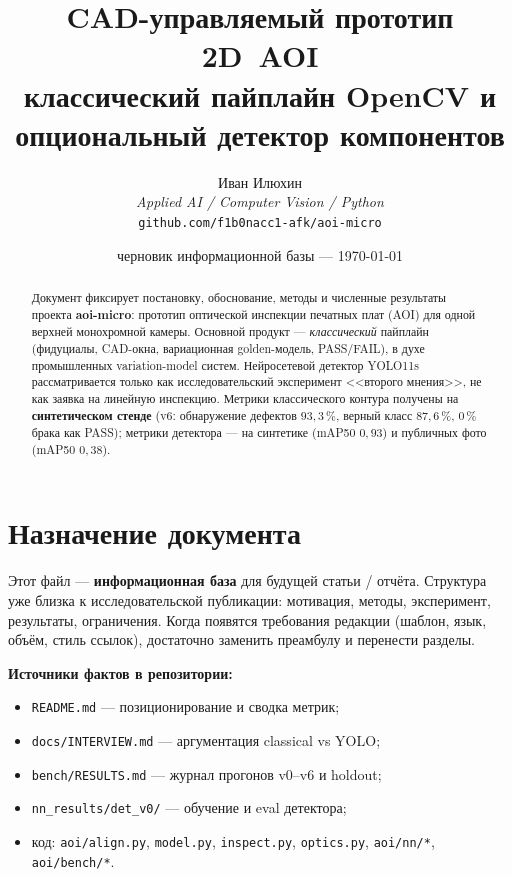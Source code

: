 \documentclass[12pt,a4paper]{article}
\title{CAD-управляемый прототип 2D~AOI\\
\large классический пайплайн OpenCV и опциональный детектор компонентов}
\author{Иван Илюхин\\
\textit{Applied AI / Computer Vision / Python}\\
\texttt{github.com/f1b0nacc1-afk/aoi-micro}}
\date{черновик информационной базы --- \today}
\begin{document}
\maketitle

\begin{abstract}
\noindent
Документ фиксирует постановку, обоснование, методы и численные результаты
проекта \textbf{aoi-micro}: прототип оптической инспекции печатных плат (AOI)
для одной верхней монохромной камеры. Основной продукт --- \emph{классический}
пайплайн (фидуциалы, CAD-окна, вариационная golden-модель, PASS/FAIL),
в духе промышленных variation-model систем. Нейросетевой детектор YOLO11s
рассматривается только как исследовательский эксперимент <<второго мнения>>,
не как заявка на линейную инспекцию. Метрики классического контура получены
на \textbf{синтетическом стенде} (v6: обнаружение дефектов \(93{,}3\,\%\),
верный класс \(87{,}6\,\%\), \(0\,\%\) брака как PASS); метрики детектора ---
на синтетике (mAP50 \(0{,}93\)) и публичных фото (mAP50 \(0{,}38\)).
\end{abstract}

\tableofcontents
\newpage

\section{Назначение документа}

Этот файл --- \textbf{информационная база} для будущей статьи / отчёта.
Структура уже близка к исследовательской публикации: мотивация, методы,
эксперимент, результаты, ограничения. Когда появятся требования редакции
(шаблон, язык, объём, стиль ссылок), достаточно заменить преамбулу и
перенести разделы.

\textbf{Источники фактов в репозитории:}
\begin{itemize}[leftmargin=1.5em,itemsep=0.2em]
  \item \texttt{README.md} --- позиционирование и сводка метрик;
  \item \texttt{docs/INTERVIEW.md} --- аргументация classical vs YOLO;
  \item \texttt{bench/RESULTS.md} --- журнал прогонов v0--v6 и holdout;
  \item \texttt{nn\_results/det\_v0/} --- обучение и eval детектора;
  \item код: \texttt{aoi/align.py}, \texttt{model.py}, \texttt{inspect.py},
        \texttt{optics.py}, \texttt{aoi/nn/*}, \texttt{aoi/bench/*}.
\end{itemize}
\end{document}
